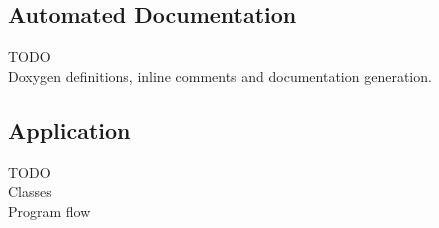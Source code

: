\subsection{Automated Documentation}

TODO
\\
Doxygen definitions, inline comments and documentation generation.

\subsection{Application}

TODO
\\
Classes
\\
Program flow